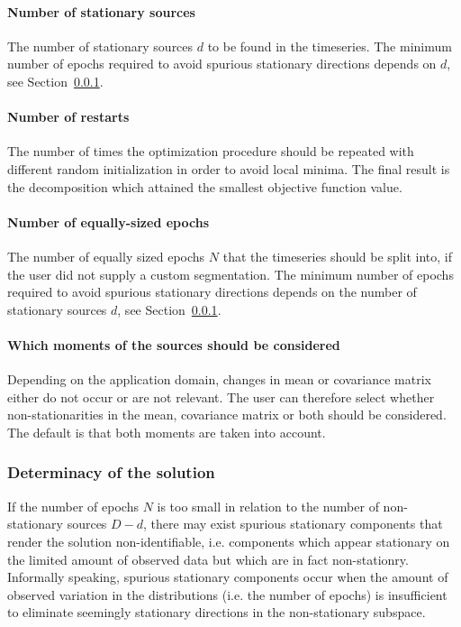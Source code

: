 \documentclass{article}
\newcommand{\1}{\ensuremath{\mathds{1}}}
\newcommand{\0}{\ensuremath{0}}
\begin{document}
\paragraph{Number of stationary sources} The number of stationary sources $d$ to be 
found in the timeseries. The minimum number of epochs required to avoid spurious
stationary directions depends on $d$, see Section~\ref{sec:determinacy}. 

\paragraph{Number of restarts} The number of times the optimization procedure
should be repeated with different random initialization in order to avoid local minima.
The final result is the decomposition which attained the smallest objective function
value.

\paragraph{Number of equally-sized epochs} The number of equally sized epochs $N$ that 
the timeseries should be split into, if the user did not supply a custom segmentation.
The minimum number of epochs required to avoid spurious
stationary directions depends on the number of stationary sources $d$, see Section~\ref{sec:determinacy}. 

\paragraph{Which moments of the sources should be considered} Depending on the application domain, changes in mean or covariance matrix either do not occur or are not relevant. The user can therefore select whether non-stationarities in the mean, covariance matrix or both should be considered. The default is that both moments are taken into account.

\subsubsection{Determinacy of the solution}
\label{sec:determinacy}

If the number of epochs $N$ is too small in relation to the number of 
non-stationary sources $D-d$, there may exist spurious stationary components that render
the solution non-identifiable, i.e. components which appear stationary on the
limited amount of observed data but which are in fact non-stationry.
Informally speaking, spurious stationary components occur when the amount of 
observed variation in the distributions (i.e. the number of epochs) is insufficient 
to eliminate seemingly stationary directions in the non-stationary subspace. 
\end{document}
